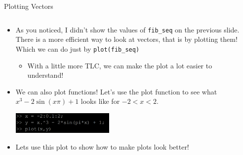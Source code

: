 {}\documentclass[letterpaper,
compress,
xcolor=x11names,
]{beamer}
\begin{document}
\begin{frame}{Plotting Vectors}
	\footnotesize
	\begin{columns}
		\begin{column}{0.6\linewidth}
			\begin{itemize}
				\item As you noticed, I didn't show the values of \texttt{fib\_seq} on the previous slide. There is a more efficient way to look at vectors, that is by plotting them! Which we can do just by \texttt{plot(fib\_seq)}	
				\begin{itemize}
					\item With a little more TLC, we can make the plot a lot easier to understand!
				\end{itemize}
				\item<3-> We can also plot functions! Let's use the plot function to see what $x^3 - 2\sin(x\pi) + 1$ looks like for $-2 < x < 2$.\\
				\begin{center}
					\includegraphics[width = 5cm]{function_plot_commands.png}
				\end{center}
				\item<4-> Lets use this plot to show how to make plots look better!				
			\end{itemize}
		\end{column}
		\begin{column}{0.4\linewidth}

\end{column}
\end{columns}
\end{frame}
\end{document}
